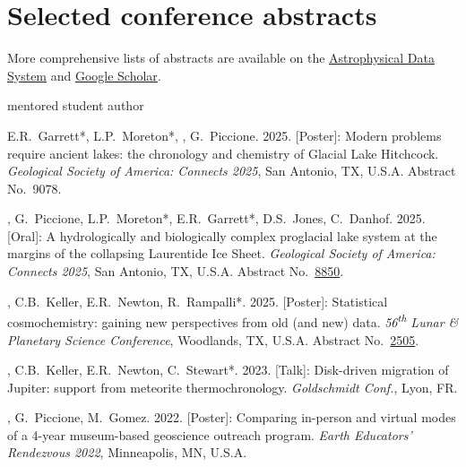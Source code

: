 \section{Selected conference abstracts}

More comprehensive lists of abstracts are available on the \href{https://ui.adsabs.harvard.edu/search/q=author%3A%22Edwards%2C%20Graham%20Harper%22}{Astrophysical Data System} and \href{https://scholar.google.com/citations?user=KHLOvgcAAAAJ&hl=en}{Google Scholar}.

\hfill* mentored student author

\begin{etaremune} [itemsep=4pt, leftmargin=3ex]
  
  \item E.R.~Garrett*, L.P.~Moreton*, \ghedwards, G.~Piccione. 2025. [Poster]: Modern problems require ancient lakes: the chronology and chemistry of Glacial Lake Hitchcock. \textit{Geological Society of America: Connects 2025}, San Antonio, TX, U.S.A. Abstract No.~9078.
  
  \item \ghedwards, G.~Piccione, L.P.~Moreton*, E.R.~Garrett*, D.S.~Jones, C.~Danhof. 2025. [Oral]: A hydrologically and biologically complex proglacial lake system at the margins of the collapsing Laurentide Ice Sheet. \textit{Geological Society of America: Connects 2025}, San Antonio, TX, U.S.A. Abstract No.~\href{https://gsameetings.secure-platform.com/connects25/solicitations/103002/sessiongallery/schedule/items/95040/application/8850}{8850}.

  \item \ghedwards, C.B.~Keller, E.R.~Newton, R.~Rampalli*. 2025. [Poster]: Statistical cosmochemistry: gaining new perspectives from old (and new) data. \textit{56\textsuperscript{th} Lunar \& Planetary Science Conference}, Woodlands, TX, U.S.A. Abstract No.~\href{https://www.hou.usra.edu/meetings/lpsc2025/pdf/2505.pdf}{2505}.

  \item \ghedwards, C.B.~Keller, E.R.~Newton, C.~Stewart*. 2023. [Talk]: Disk-driven migration of Jupiter: support from meteorite thermochronology. \textit{Goldschmidt Conf.}, Lyon, FR. 

  \item \ghedwards, G.~Piccione, M.~Gomez. 2022. [Poster]: Comparing in-person and virtual modes of a 4-year museum-based geoscience outreach program. \textit{Earth Educators' Rendezvous 2022}, Minneapolis, MN, U.S.A.


\end{etaremune}
